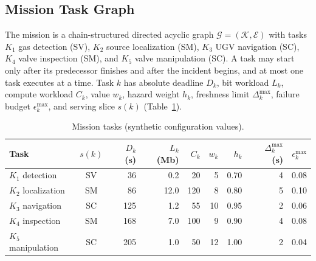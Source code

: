 \documentclass[conference]{IEEEtran}
\begin{document}
\subsection{Mission Task Graph}
The mission is a chain-structured directed acyclic graph $\mathcal{G}=(\mathcal{K},\mathcal{E})$ with tasks $K_1$ gas detection (SV), $K_2$ source localization (SM), $K_3$ UGV navigation (SC), $K_4$ valve inspection (SM), and $K_5$ valve manipulation (SC). A task may start only after its predecessor finishes and after the incident begins, and at most one task executes at a time. Task $k$ has absolute deadline $D_k$, bit workload $L_k$, compute workload $C_k$, value $w_k$, hazard weight $h_k$, freshness limit $\Delta_k^{\max}$, failure budget $\epsilon_k^{\max}$, and serving slice $s(k)$ (Table~\ref{tab:tasks}).

\begin{table}[t]
\centering
\caption{Mission tasks (synthetic configuration values).}
\label{tab:tasks}
\scriptsize
\setlength{\tabcolsep}{3pt}
\begin{tabular}{lcrrrrrrr}
\toprule
Task & $s(k)$ & $D_k$ (s) & $L_k$ (Mb) & $C_k$ & $w_k$ & $h_k$ & $\Delta_k^{\max}$ (s) & $\epsilon_k^{\max}$\\
\midrule
$K_1$ detection & SV & 36 & 0.2 & 20 & 5 & 0.70 & 4 & 0.08\\
$K_2$ localization & SM & 86 & 12.0 & 120 & 8 & 0.80 & 5 & 0.10\\
$K_3$ navigation & SC & 125 & 1.2 & 55 & 10 & 0.95 & 2 & 0.06\\
$K_4$ inspection & SM & 168 & 7.0 & 100 & 9 & 0.90 & 4 & 0.08\\
$K_5$ manipulation & SC & 205 & 1.0 & 50 & 12 & 1.00 & 2 & 0.04\\
\bottomrule
\end{tabular}
\end{table}
\end{document}
